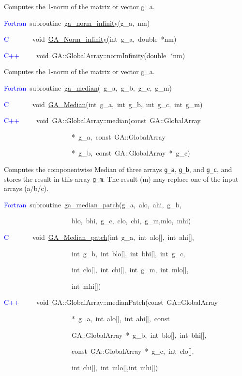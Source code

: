 Computes the 1-norm of the matrix or vector g\_a. 
\begin{lyxcode}
\textcolor{blue}{Fortran}~subroutine~\href{http://www.emsl.pnl.gov/docs/global/ga_ops.html\#ga_norm_infinity}{ga\_{}norm\_{}infinity}(g\_a,~nm)~

\textcolor{blue}{C}~~~~~~~void~\href{http://www.emsl.pnl.gov/docs/global/c_nga_ops.html\#ga_norm_infinity}{GA\_{}Norm\_{}infinity}(int~g\_a,~double~{*}nm)~

\textcolor{blue}{C++}~~~~~void~GA::GlobalArray::normInfinity(double~{*}nm)
\end{lyxcode}
Computes the 1-norm of the matrix or vector g\_a. 
\begin{lyxcode}
\textcolor{blue}{Fortran}~subroutine~\href{http://www.emsl.pnl.gov/docs/global/ga_ops.html\#ga_median}{ga\_{}median}(~g\_a,~g\_b,~g\_c,~g\_m)

\textcolor{blue}{C}~~~~~~~void~\href{http://www.emsl.pnl.gov/docs/global/c_nga_ops.html\#ga_median}{GA\_{}Median}(int~g\_a,~int~g\_b,~int~g\_c,~int~g\_m)

\textcolor{blue}{C++}~~~~~void~GA::GlobalArray::median(const~GA::GlobalArray~

~~~~~~~~~~~~~~~~~~~~{*}~g\_a,~const~GA::GlobalArray~

~~~~~~~~~~~~~~~~~~~~{*}~g\_b,~const~GA::GlobalArray~{*}~g\_c)
\end{lyxcode}
Computes the componentwise Median of three arrays \texttt{g\_a}, \texttt{g\_b},
and \texttt{g\_c}, and stores the result in this array \texttt{g\_m}.
The result (m) may replace one of the input arrays (a/b/c). 
\begin{lyxcode}
\textcolor{blue}{Fortran}~subroutine~\href{http://www.emsl.pnl.gov/docs/global/ga_ops.html\#ga_median_patch}{ga\_{}median\_{}patch}(g\_a,~alo,~ahi,~g\_b,~

~~~~~~~~~~~~~~~~~~~~blo,~bhi,~g\_c,~clo,~chi,~g\_m,mlo,~mhi)~

\textcolor{blue}{C}~~~~~~~void~\href{http://www.emsl.pnl.gov/docs/global/c_nga_ops.html\#ga_median_patch}{GA\_{}Median\_{}patch}(int~g\_a,~int~alo{[}{]},~int~ahi{[}{]},~

~~~~~~~~~~~~~~~~~~~~int~g\_b,~int~blo{[}{]},~int~bhi{[}{]},~int~g\_c,~

~~~~~~~~~~~~~~~~~~~~int~clo{[}{]},~int~chi{[}{]},~int~g\_m,~int~mlo{[}{]},

~~~~~~~~~~~~~~~~~~~~int~mhi{[}{]})~

\textcolor{blue}{C++}~~~~~void~GA::GlobalArray::medianPatch(const~GA::GlobalArray

~~~~~~~~~~~~~~~~~~~~{*}~g\_a,~int~alo{[}{]},~int~ahi{[}{]},~const~

~~~~~~~~~~~~~~~~~~~~GA::GlobalArray~{*}~g\_b,~int~blo{[}{]},~int~bhi{[}{]},~

~~~~~~~~~~~~~~~~~~~~const~GA::GlobalArray~{*}~g\_c,~int~clo{[}{]},~

~~~~~~~~~~~~~~~~~~~~int~chi{[}{]},~int~mlo{[}{]},int~mhi{[}{]})
\end{lyxcode}
